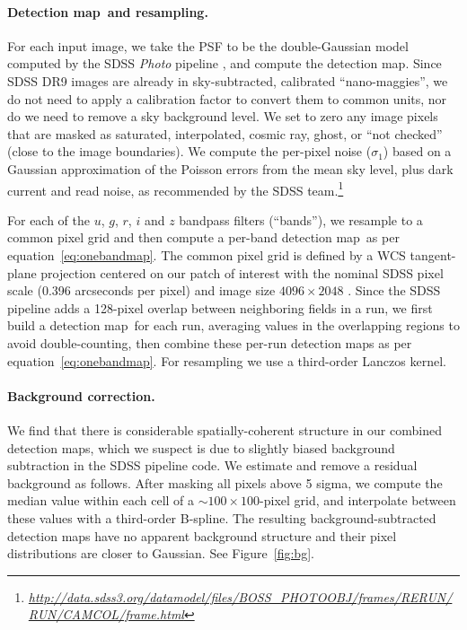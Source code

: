 \documentclass[letterpaper,preprint]{aastex}
\newcommand{\equationname}{equation}
\newcommand{\eqnref}[1]{\mbox{\equationname~\ref{#1}}}
\newcommand{\niceurl}[1]{\mbox{\href{#1}{\textsl{#1}}}}
\newcommand{\fig}{Figure}
\newcommand{\figref}[1]{\mbox{\fig~\ref{#1}}}
\newcommand{\detmap}{detection map}
\newcommand{\Detmap}{Detection map}
\begin{document}
\paragraph{\Detmap\ and resampling.}
For each input image, we take the PSF to be the double-Gaussian model
computed by the SDSS \emph{Photo} pipeline \cite{photo}, and compute
the \detmap.  Since SDSS DR9 images are already in sky-subtracted,
calibrated ``nano-maggies'', we do not need to apply a calibration
factor to convert them to common units, nor do we need to remove a sky
background level.  We set to zero any image pixels that are masked as
saturated, interpolated, cosmic ray, ghost, or ``not checked'' (close
to the image boundaries).
We compute the per-pixel noise ($\sigma_1$) based on a Gaussian
approximation of the Poisson errors from the mean sky level, plus dark
current and read noise, as recommended by the SDSS
team.\footnote{\niceurl{http://data.sdss3.org/datamodel/files/BOSS\_PHOTOOBJ/frames/RERUN/RUN/CAMCOL/frame.html}}


For each of the $u$, $g$, $r$, $i$ and $z$ bandpass filters
(``bands''), we resample to a common pixel grid and then compute a
per-band \detmap\ as per \eqnref{eq:onebandmap}.  The common pixel
grid is defined by a WCS tangent-plane projection centered on our
patch of interest with the nominal SDSS pixel scale (0.396 arcseconds
per pixel) and image size $4096 \times 2048$ \cite{wcs}.  Since the
SDSS pipeline adds a 128-pixel overlap between neighboring fields in a
run, we first build a \detmap\ for each run, averaging values in the
overlapping regions to avoid double-counting, then combine these
per-run \detmap s as per \eqnref{eq:onebandmap}.  For resampling we
use a third-order Lanczos kernel.


\paragraph{Background correction.}
We find that there is considerable spatially-coherent structure in our
combined \detmap s, which we suspect is due to slightly biased
background subtraction in the SDSS pipeline code.  We estimate and
remove a residual background as follows.  After masking all pixels
above 5 sigma, we compute the
median value within each cell of a $\sim 100 \times 100$-pixel grid,
and interpolate between these values with a third-order B-spline.  The
resulting background-subtracted \detmap s have no apparent background
structure and their pixel distributions are closer to Gaussian.  See
\figref{fig:bg}.
\end{document}
